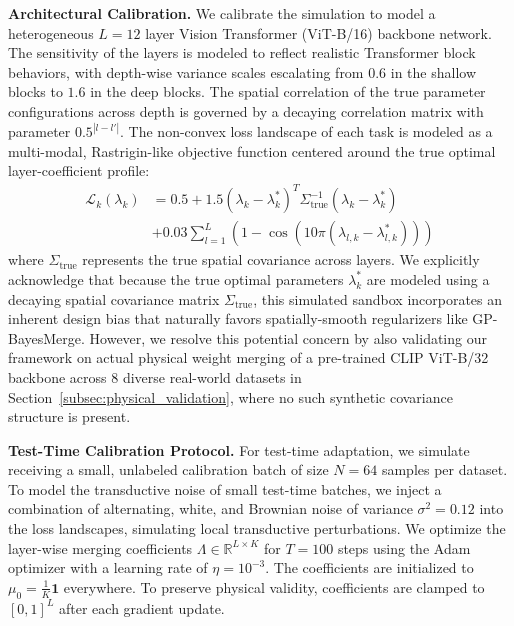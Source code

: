 \textbf{Architectural Calibration.} We calibrate the simulation to model a
heterogeneous $L=12$ layer Vision Transformer (ViT-B/16) backbone network. The
sensitivity of the layers is modeled to reflect realistic Transformer block
behaviors, with depth-wise variance scales escalating from $0.6$ in the shallow
blocks to $1.6$ in the deep blocks. The spatial correlation of the true
parameter configurations across depth is governed by a decaying correlation
matrix with parameter $0.5^{|l - l'|}$. The non-convex loss landscape of each
task is modeled as a multi-modal, Rastrigin-like objective function centered
around the true optimal layer-coefficient profile:
\begin{equation}
\begin{aligned}
\mathcal{L}_k(\lambda_k) &= 0.5 + 1.5 (\lambda_k - \lambda^*_k)^T
\Sigma_{\text{true}}^{-1} (\lambda_k - \lambda^*_k) \\
&+ 0.03 \sum_{l=1}^L (1 - \cos(10 \pi (\lambda_{l, k} - \lambda^*_{l, k})))
\end{aligned}
\end{equation}
where $\Sigma_{\text{true}}$ represents the true spatial covariance across
layers. We explicitly acknowledge that because the true optimal parameters
$\lambda^*_k$ are modeled using a decaying spatial covariance matrix
$\Sigma_{\text{true}}$, this simulated sandbox incorporates an inherent design
bias that naturally favors spatially-smooth regularizers like GP-BayesMerge.
However, we resolve this potential concern by also validating our framework on
actual physical weight merging of a pre-trained CLIP ViT-B/32 backbone across 8
diverse real-world datasets in Section~\ref{subsec:physical_validation}, where
no such synthetic covariance structure is present.

\textbf{Test-Time Calibration Protocol.} For test-time adaptation, we simulate
receiving a small, unlabeled calibration batch of size $N=64$ samples per
dataset. To model the transductive noise of small test-time batches, we inject a
combination of alternating, white, and Brownian noise of variance $\sigma^2 =
0.12$ into the loss landscapes, simulating local transductive perturbations. We
optimize the layer-wise merging coefficients $\Lambda \in \mathbb{R}^{L \times
K}$ for $T=100$ steps using the Adam optimizer with a learning rate of $\eta =
10^{-3}$. The coefficients are initialized to $\mu_0 = \frac{1}{K} \mathbf{1}$
everywhere. To preserve physical validity, coefficients are clamped to $[0,
1]^L$ after each gradient update.

